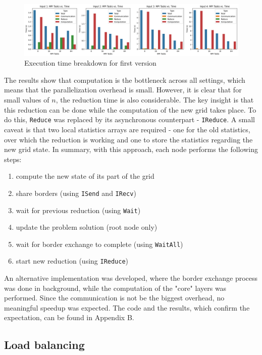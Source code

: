 \documentclass{article}
\begin{document}
\begin{figure}[htbp]
    \centering
    \includegraphics[width=1\textwidth]{img/first-version-breakdown.png}
    \caption{Execution time breakdown for first version}
    \label{time-breakdown}
\end{figure}

The results show that computation is the bottleneck across all settings, which means that
the parallelization overhead is small. However, it is
clear that for small values of $n$, the reduction time is also considerable. The key insight
is that this reduction can be done while the computation of the new grid takes place.
To do this, \texttt{Reduce} was 
replaced by its asynchronous counterpart - \texttt{IReduce}. A small caveat is that
two local statistics arrays are required - one for the old statistics, over which the 
reduction is working and one to store the statistics regarding the new grid state.
In summary, with this approach, each node performs the following steps:

\begin{enumerate}
	\itemsep -0.2em
	\item compute the new state of its part of the grid
	\item share borders (using \texttt{ISend} and \texttt{IRecv})
	\item wait for previous reduction (using \texttt{Wait})
	\item update the problem solution (root node only) 
	\item wait for border exchange to complete (using \texttt{WaitAll})
	\item start new reduction (using \texttt{IReduce})
\end{enumerate}

An alternative implementation was developed, where the border exchange process
was done in background, while the computation of the "core" layers was performed.
Since the communication is not be the biggest overhead, no meaningful speedup
was expected. The code and the results, which confirm the expectation, can be found
in Appendix B.

\subsection{Load balancing}
\end{document}
